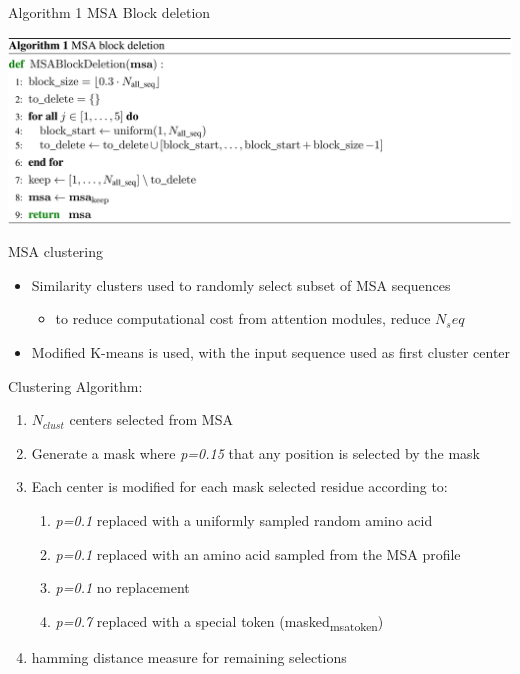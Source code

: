 \documentclass[presentation, smaller]{beamer}
\begin{document}
\begin{frame}[label={sec:orgc02b307}]{Algorithm 1 MSA Block deletion \cite{jumperHighlyAccurateProtein2021}}
\begin{center}
\includegraphics[width=.9\linewidth]{./imgs/algo1_block_deletion.png}
\end{center}
\end{frame}
\begin{frame}[label={sec:orgca76dd1}]{MSA clustering \cite{jumperHighlyAccurateProtein2021}}
\begin{itemize}
\item Similarity clusters used to randomly select subset of MSA sequences 
\begin{itemize}
\item to reduce computational cost from attention modules, reduce \(N_seq\)
\end{itemize}
\item Modified K-means is used, with the input sequence used as first cluster center
\end{itemize}

Clustering Algorithm:
\begin{enumerate}
\item \(N_{clust}\) centers selected from MSA
\item Generate a mask where \emph{p=0.15} that any position is selected by the mask
\item Each center is modified for each mask selected residue according to:
\begin{enumerate}
\item \emph{p=0.1} replaced with a uniformly sampled random amino acid
\item \emph{p=0.1} replaced with an amino acid sampled from the MSA profile
\item \emph{p=0.1} no replacement
\item \emph{p=0.7} replaced with a special token (masked\textsubscript{msa}\textsubscript{token})
\end{enumerate}
\item hamming distance measure for remaining selections
\end{enumerate}
\end{frame}
\end{document}
